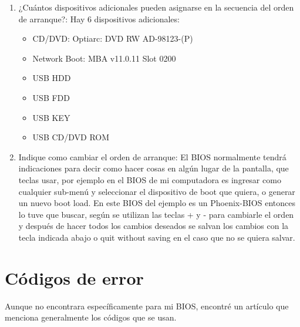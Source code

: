 \documentclass[stu, 12pt, letterpaper, donotrepeattitle, floatsintext, natbib, helv]{apa7}
\begin{document}
\begin{enumerate}
    \item ¿Cuántos dispositivos adicionales pueden asignarse en la secuencia del orden de arranque?: Hay 6 dispositivos adicionales: 
    \begin{itemize}
        \item CD/DVD: Optiarc: DVD RW AD-98123-(P)
        \item Network Boot: MBA v11.0.11 Slot 0200
        \item USB HDD
        \item USB FDD
        \item USB KEY
        \item USB CD/DVD ROM
    \end{itemize}
    \item Indique como cambiar el orden de arranque: El BIOS normalmente tendrá indicaciones para decir como hacer cosas en algún lugar de la pantalla, que teclas usar, por ejemplo en el BIOS de mi computadora es ingresar como cualquier sub-menú y seleccionar el dispositivo de boot que quiera, o generar un nuevo boot load. En este BIOS del ejemplo es un Phoenix-BIOS entonces lo tuve que buscar, según \cite{BIOSBootChanges} se utilizan las teclas + y - para cambiarle el orden y después de hacer todos los cambios deseados se salvan los cambios con la tecla indicada abajo o quit without saving en el caso que no se quiera salvar.
\end{enumerate}

\section*{Códigos de error}
{}

Aunque no encontrara específicamente para mi BIOS, encontré un artículo que menciona generalmente los códigos que se usan.
\end{document}
